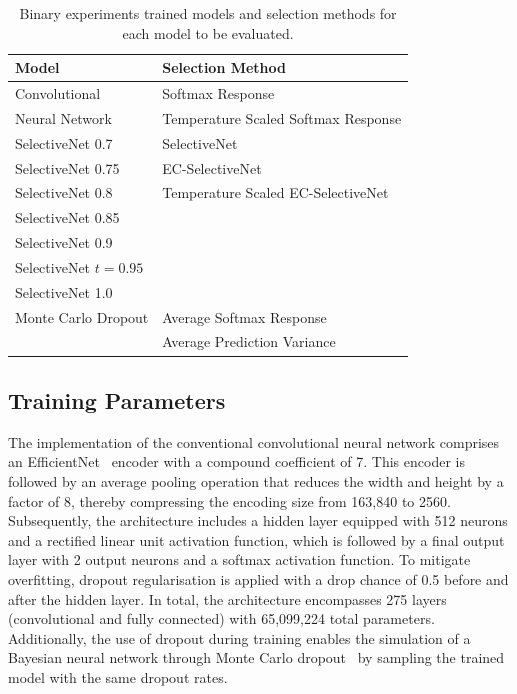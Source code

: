 \begin{table}[h]
	\centering
	\caption{Binary experiments trained models and selection methods for each model to be evaluated.}
	\label{tab:binary-experiment-setup}
	\begin{tabular}{|l|l|}
		\hline
		Model & Selection Method \\ \hline
		Convolutional & Softmax Response \\
		Neural Network & Temperature Scaled Softmax Response \\ \hline
		SelectiveNet 0.7 & SelectiveNet \\
		SelectiveNet 0.75 & EC-SelectiveNet \\
		SelectiveNet 0.8 & Temperature Scaled EC-SelectiveNet \\
		SelectiveNet 0.85 &  \\
		SelectiveNet 0.9 &  \\
		SelectiveNet $t=0.95$ &  \\
		SelectiveNet 1.0 &  \\ \hline
		Monte Carlo Dropout & Average Softmax Response \\
		& Average Prediction Variance \\ \hline
	\end{tabular}
\end{table}


\subsection{Training Parameters}
\label{subsec:selective_binary_training}
The implementation of the conventional convolutional neural network comprises an EfficientNet~\citep{tan2019efficient} encoder with a compound coefficient of 7. This encoder is followed by an average pooling operation that reduces the width and height by a factor of 8, thereby compressing the encoding size from 163,840 to 2560. Subsequently, the architecture includes a hidden layer equipped with 512 neurons and a rectified linear unit activation function, which is followed by a final output layer with 2 output neurons and a softmax activation function. To mitigate overfitting, dropout regularisation is applied with a drop chance of 0.5 before and after the hidden layer. In total, the architecture encompasses 275 layers (convolutional and fully connected) with 65,099,224 total parameters. Additionally, the use of dropout during training enables the simulation of a Bayesian neural network through Monte Carlo dropout~\citep{gal2016dropout} by sampling the trained model with the same dropout rates.


